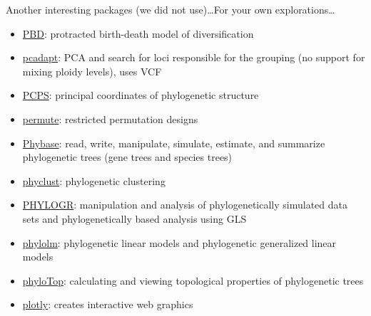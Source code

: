 \documentclass[compress, xelatex, 11pt, xcolor=svgnames, aspectratio=169, url={hyphens, lowtilde}]{beamer}
\begin{document}
\begin{frame}[allowframebreaks]{Another interesting packages (we did not use)\ldots}{For your own explorations\ldots}
\begin{itemize}
		\item \href{https://CRAN.R-project.org/package=PBD}{PBD}: protracted birth-death model of diversification
		\item \href{https://CRAN.R-project.org/package=pcadapt}{pcadapt}: PCA and search for loci responsible for the grouping (no support for mixing ploidy levels), uses VCF
		\item \href{https://CRAN.R-project.org/package=PCPS}{PCPS}: principal coordinates of phylogenetic structure
		\item \href{https://CRAN.R-project.org/package=permute}{permute}: restricted permutation designs
		\item \href{https://github.com/lliu1871/phybase}{Phybase}: read, write, manipulate, simulate, estimate, and summarize phylogenetic trees (gene trees and species trees)
		\item \href{https://CRAN.R-project.org/package=phyclust}{phyclust}: phylogenetic clustering
		\item \href{https://CRAN.R-project.org/package=PHYLOGR}{PHYLOGR}: manipulation and analysis of phylogenetically simulated data sets and phylogenetically based analysis using GLS
		\item \href{https://CRAN.R-project.org/package=phylolm}{phylolm}: phylogenetic linear models and phylogenetic generalized linear models
		\item \href{https://CRAN.R-project.org/package=phyloTop}{phyloTop}: calculating and viewing topological properties of phylogenetic trees
		\item \href{https://CRAN.R-project.org/package=plotly}{plotly}: creates interactive web graphics

\end{itemize}
\end{frame}
\end{document}
